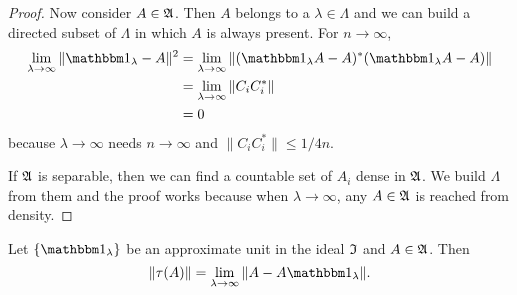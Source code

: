 \begin{proof}
Now consider $A\in\mathfrak{A}$. Then $A$ belongs to a $\lambda\in\Lambda$ and we can build a directed subset of $\Lambda$ in which $A$ is always present. For $n\to\infty$,
\begin{equation}
\begin{split}
  \lim_{\lambda\to\infty}\| \cun_{\lambda}-A \|^2&=\lim_{\lambda\to\infty}\| (\cun_{\lambda}A-A)^*(\cun_{\lambda}A-A) \|\\
                                                &=\lim_{\lambda\to\infty}\| C_iC_i^* \|\\
                                                &=0 
\end{split}
\end{equation}
because $\lambda\to\infty$ needs $n\to\infty$ and $\| C_iC_i^* \|\leq 1/4n$.

If $\mathfrak{A}$ is separable, then we can find a countable set of $A_i$ dense in $\mathfrak{A}$. We build $\Lambda$ from them and the proof works because when $\lambda\to\infty$, any $A\in\mathfrak{A}$ is reached from density.

\end{proof}


\begin{lemma} \label{lem:taulimA}
Let $\{ \cun_{\lambda} \}$ be an approximate unit in the ideal $\mathfrak{I}$ and $A\in\mathfrak{A}$. Then
\begin{equation}
\| \tau(A)\|=\lim_{\lambda\to\infty}\| A-A\cun_{\lambda} \|.
\end{equation}

\end{lemma}


